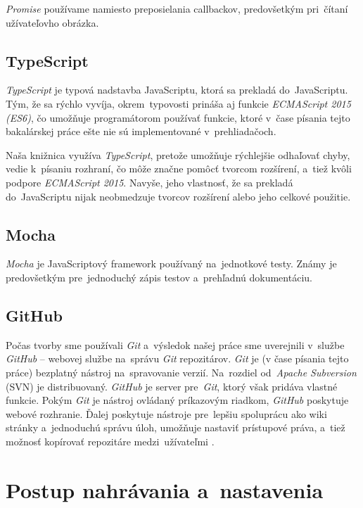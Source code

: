 \emph{Promise} používame namiesto preposielania callbackov, predovšetkým pri~čítaní užívateľovho obrázka.

\subsection{TypeScript}

\emph{TypeScript} je typová nadstavba JavaScriptu, ktorá sa prekladá do~JavaScriptu. Tým, že sa rýchlo vyvíja, okrem~typovosti prináša aj funkcie \emph{ECMAScript 2015 (ES6)}, čo umožňuje programátorom používať funkcie, ktoré v~čase písania tejto bakalárskej práce ešte nie sú implementované v~prehliadačoch.

Naša knižnica využíva \emph{TypeScript}, pretože umožňuje rýchlejšie odhaľovať chyby, vedie k~písaniu rozhraní, čo môže značne pomôcť tvorcom rozšírení, a~tiež kvôli podpore \emph{ECMAScript 2015}. Navyše, jeho vlastnosť, že sa prekladá do~JavaScriptu nijak neobmedzuje tvorcov rozšírení alebo jeho celkové použitie.

\subsection{Mocha}

\emph{Mocha} je JavaScriptový framework používaný na~jednotkové testy. Známy je predovšetkým pre~jednoduchý zápis testov a~prehľadnú dokumentáciu.


\subsection{GitHub}

Počas tvorby sme používali \emph{Git} a~výsledok našej práce sme uverejnili v~službe \emph{GitHub} -- webovej službe na~správu \emph{Git} repozitárov. \emph{Git} je (v čase písania tejto práce) bezplatný nástroj na~spravovanie verzií. Na~rozdiel od~\emph{Apache Subversion} (SVN) je distribuovaný. \emph{GitHub} je server pre~\emph{Git}, ktorý však pridáva vlastné funkcie. Pokým \emph{Git} je nástroj ovládaný príkazovým riadkom, \emph{GitHub} poskytuje webové rozhranie. Ďalej poskytuje nástroje pre~lepšiu spoluprácu ako wiki stránky a~jednoduchú správu úloh, umožňuje nastaviť prístupové práva, a~tiež možnosť kopírovať repozitáre medzi~užívateľmi \cite{Git_TechCrunch}. 


\section{Postup nahrávania a~nastavenia}
\label{sec:upload-and-settings}


